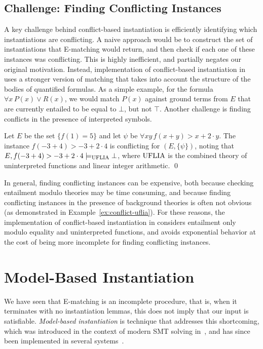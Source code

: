 \documentclass[oribibl]{llncs}
\begin{document}
\subsection{Challenge: Finding Conflicting Instances}
A key challenge behind conflict-based instantiation
is efficiently identifying which instantiations are conflicting.
A naive approach would be to construct the set of instantiations that E-matching would return, 
and then check if each one of these instances was conflicting.
This is highly inefficient, and partially negates our original motivation.
Instead, implementation of conflict-based instantiation in \cvc uses a stronger version of matching
that takes into account the structure of the bodies of quantified formulas.
As a simple example, for the formula $\forall x\, P( x ) \vee R( x )$, we would match
$P( x )$ against ground terms from $E$ that are currently entailed to be equal to $\bot$, but not $\top$.
Another challenge is finding conflicts in the presence of interpreted symbols.
\begin{example}
\label{ex:conflict-uflia}
Let $E$ be the set $\{ f( 1 ) = 5 \}$ and let $\psi$ be $\forall xy\, f( x + y ) > x + 2 \cdot y$.
The instance $f( -3 + 4 ) > -3 + 2 \cdot 4$ is conflicting for $( E, \{ \psi \} )$,
noting that $E, f( -3 + 4 ) > -3 + 2 \cdot 4 \models_{\mathrm{UFLIA}} \bot$, where $\mathrm{UFLIA}$ is the combined
theory of uninterpreted functions and linear integer arithmetic.
\qed
\end{example}
In general, finding conflicting instances can be expensive, 
both because checking entailment modulo theories may be time consuming,
and because finding conflicting instances in the presence of background theories is often not obvious (as demonstrated in Example~\ref{ex:conflict-uflia}).
For these reasons,
the implementation of conflict-based instantiation in \cvc
considers entailment only modulo equality and uninterpreted functions,
and avoids exponential behavior at the cost of being more incomplete for finding conflicting instances. 

\section{Model-Based Instantiation}
\label{sec:mbqi}

We have seen that E-matching is an incomplete procedure,
that is, when it terminates with no instantiation lemmas, this does not imply that our input is satisfiable.
\emph{Model-based instantiation} is technique that addresses this shortcoming,
which was introduced in the context of modern SMT solving in~\cite{GeDeM-CAV-09},
and has since been implemented in several systems~\cite{Jacobs09,ReyEtAl-CADE-13}.
\end{document}

